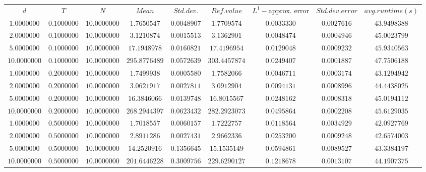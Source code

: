 \begin{tabular}{ccccccccc}
$d$ & $T$ & $N$ & $Mean$ & $Std. dev.$ & $Ref. value$ & $L^1-$approx. error & $Std. dev. error$ & $avg. runtime (s)$\\
$1.0000000$ & $0.1000000$ & $10.0000000$ & $1.7650547$ & $0.0048907$ & $1.7709574$ & $0.0033330$ & $0.0027616$ & $43.9498388$\\
$2.0000000$ & $0.1000000$ & $10.0000000$ & $3.1210874$ & $0.0015513$ & $3.1362901$ & $0.0048474$ & $0.0004946$ & $45.0023799$\\
$5.0000000$ & $0.1000000$ & $10.0000000$ & $17.1948978$ & $0.0160821$ & $17.4196954$ & $0.0129048$ & $0.0009232$ & $45.9340563$\\
$10.0000000$ & $0.1000000$ & $10.0000000$ & $295.8776489$ & $0.0572639$ & $303.4457874$ & $0.0249407$ & $0.0001887$ & $47.7506188$\\
$1.0000000$ & $0.2000000$ & $10.0000000$ & $1.7499938$ & $0.0005580$ & $1.7582066$ & $0.0046711$ & $0.0003174$ & $43.1294942$\\
$2.0000000$ & $0.2000000$ & $10.0000000$ & $3.0621917$ & $0.0027811$ & $3.0912904$ & $0.0094131$ & $0.0008996$ & $44.4438025$\\
$5.0000000$ & $0.2000000$ & $10.0000000$ & $16.3846066$ & $0.0139748$ & $16.8015567$ & $0.0248162$ & $0.0008318$ & $45.0194112$\\
$10.0000000$ & $0.2000000$ & $10.0000000$ & $268.2944397$ & $0.0623432$ & $282.2923073$ & $0.0495864$ & $0.0002208$ & $45.6129035$\\
$1.0000000$ & $0.5000000$ & $10.0000000$ & $1.7018557$ & $0.0060157$ & $1.7222757$ & $0.0118564$ & $0.0034929$ & $42.0927769$\\
$2.0000000$ & $0.5000000$ & $10.0000000$ & $2.8911286$ & $0.0027431$ & $2.9662336$ & $0.0253200$ & $0.0009248$ & $42.6574003$\\
$5.0000000$ & $0.5000000$ & $10.0000000$ & $14.2520916$ & $0.1356645$ & $15.1535149$ & $0.0594861$ & $0.0089527$ & $43.3384197$\\
$10.0000000$ & $0.5000000$ & $10.0000000$ & $201.6446228$ & $0.3009756$ & $229.6290127$ & $0.1218678$ & $0.0013107$ & $44.1907375$\\
\end{tabular}
